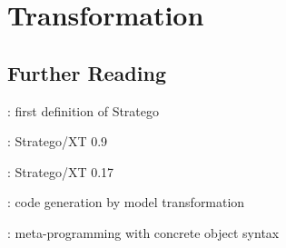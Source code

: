 \chapter{Transformation}

\section{Further Reading}

\cite{VisserBT98}: first definition of Stratego

\cite{Visser03}: Stratego/XT 0.9

\cite{BravenboerKVV08}: Stratego/XT 0.17

\cite{HemelKGV10}: code generation by model transformation


\cite{Visser02}: meta-programming with concrete object syntax